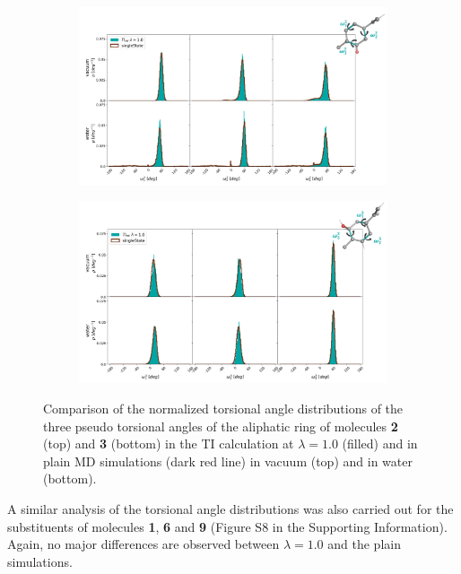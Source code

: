 \begin{figure}[h!]
    \centering
    \begin{subfigure}{0.85\columnwidth}
        \includegraphics[width=\textwidth]{fig/results/pairwise/sampling/torsions/TI_O70_rtorsion_ana_partnerM030_singleState_populations_total.png}
        \end{subfigure}
    \begin{subfigure}{0.85\columnwidth}
        \includegraphics[width=\textwidth]{fig/results/pairwise/sampling/torsions/TI_O71_rtorsion_ana_partnerM030_singleState_populations_total.png}
        \end{subfigure}
    \caption{Comparison of the normalized torsional angle distributions of the three pseudo torsional angles of the aliphatic ring of molecules \textbf{2} (top) and \textbf{3} (bottom) in the TI calculation at $\lambda=1.0$ (filled) and in plain MD simulations (dark red line) in vacuum (top) and in water (bottom).}
    \label{fig: TIringTorisions}
\end{figure}

A similar analysis of the torsional angle distributions was also carried out for the substituents of molecules \textbf{1}, \textbf{6} and \textbf{9} (Figure S8 in the Supporting Information). Again, no major differences are observed between $\lambda=1.0$ and the plain simulations. %


